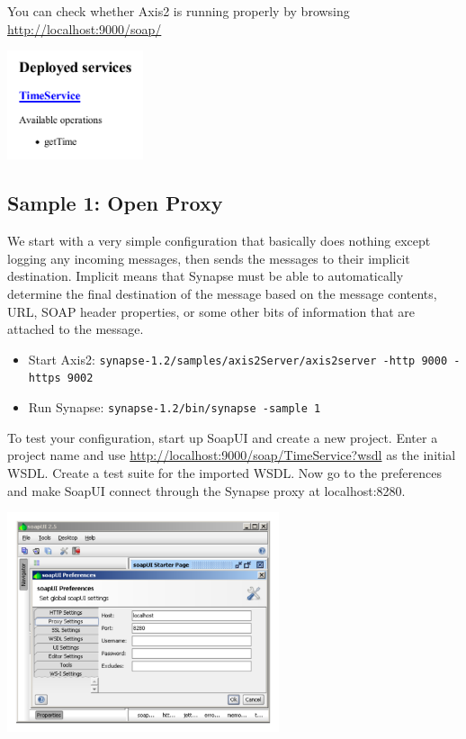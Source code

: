 You can check whether Axis2 is running properly by browsing
\url{http://localhost:9000/soap/}
\begin{center}
\includegraphics[width=4cm]{figures/axis2-success.pdf}
\end{center}

\subsection{Sample 1: Open Proxy}
\label{sec:sample-1}
We start with a very simple configuration that basically does nothing except
logging any incoming messages, then sends the messages to their implicit
destination. Implicit means that Synapse must be able to automatically
determine the final destination of the message based on the message contents,
URL, SOAP header properties, or some other bits of information that are attached to
the message.
\begin{itemize}
  \item Start Axis2: \texttt{synapse-1.2/samples/axis2Server/axis2server -http
  9000 -https 9002}
  \item Run Synapse: \texttt{synapse-1.2/bin/synapse -sample 1}
\end{itemize}

\lstset{caption=, label=sample-1-xml}


To test your configuration, start up SoapUI and create a new project. Enter a
project name and use \url{http://localhost:9000/soap/TimeService?wsdl} as the
initial WSDL. Create a test suite for the imported WSDL. Now go to the
preferences and make SoapUI connect through the Synapse proxy at localhost:8280.

\begin{center}
\includegraphics[width=8cm]{figures/soapui-proxy.pdf}
\end{center}

